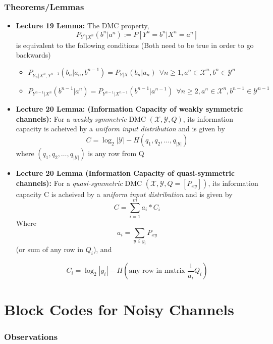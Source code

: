\documentclass{article}
\begin{document}
\subsubsection{Theorems/Lemmas}
\begin{itemize}
    \item \textbf{Lecture 19 Lemma: } The DMC property, 
    \[P_{Y^n|X^n}(b^n|a^n) := P[Y^n=b^n|X^n=a^n]\]
    is equivalent to the following conditions (Both need to be true in order to go backwards)
    \begin{itemize}
        \item \(P_{Y_n|X^n, Y^{n-1}} (b_n|a_n, b^{n-1}) = P_{Y|X} (b_n|a_n) \ \ \forall n \geq 1, a^n \in \mathcal{X}^n, b^n \in \mathcal{Y}^n\)
        \item \(P_{Y^{n-1}|X^n}(b^{n-1}|a^n) = P_{Y^{n-1}|X^{n-1}} (b^{n-1}|a^{n-1}) \ \ \forall n \geq 2, a^n \in \mathcal{X}^n, b^{n-1} \in \mathcal{Y}^{n-1}\)
    \end{itemize}
    \item \textbf{Lecture 20 Lemma: (Information Capacity of weakly symmetric channels): }
    For a \textit{weakly symmetric} DMC \((\mathcal{X}, \mathcal{Y}, Q)\), its information capacity is acheived by a \textit{uniform input distribution} and is given by
    \[C = \log_2|\mathcal{Y}| - H(q_1, q_2, \ldots, q_{|\mathcal{Y}|})\]
    where \((q_1, q_2, \ldots, q_{|\mathcal{Y}|})\) is any row from Q

    \item \textbf{Lecture 20 Lemma (Information Capacity of quasi-symmetric channels): }
    For a \textit{quasi-symmetric} DMC \((\mathcal{X}, \mathcal{Y}, Q=[P_{xy}])\), its information capacity C is acheived by a \textit{uniform input distribution} and is given by
    \[C = \sum_{i=1}^m a_i* C_i\]
    Where 
    \[a_i = \sum_{y \in y_i} P_{xy}\]
    (or sum of any row in \(Q_i\)), and

    \[C_i = \log_2 |y_i| - H(\text{any row in matrix } \frac{1}{a_i} Q_i)\]    
\end{itemize}

\section{Block Codes for Noisy Channels}
\subsubsection{Observations}
\end{document}
